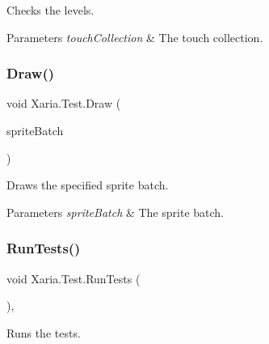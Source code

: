 Checks the levels. 


\begin{DoxyParams}{Parameters}
{\em touch\+Collection} & The touch collection.\\
\hline
\end{DoxyParams}
\mbox{\label{classXaria_1_1Test_a0c23a1aea214e972d3f48f2542343036}} 
\subsubsection{\texorpdfstring{Draw()}{Draw()}}
{\footnotesize\ttfamily void Xaria.\+Test.\+Draw (\begin{DoxyParamCaption}\item[{ref Sprite\+Batch}]{sprite\+Batch }\end{DoxyParamCaption})\hspace{0.3cm}{\ttfamily [inline]}}



Draws the specified sprite batch. 


\begin{DoxyParams}{Parameters}
{\em sprite\+Batch} & The sprite batch.\\
\hline
\end{DoxyParams}
\mbox{\label{classXaria_1_1Test_ad254f5685477c88d63b0a0ebd0ae81de}} 
\subsubsection{\texorpdfstring{Run\+Tests()}{RunTests()}}
{\footnotesize\ttfamily void Xaria.\+Test.\+Run\+Tests (\begin{DoxyParamCaption}{ }\end{DoxyParamCaption})\hspace{0.3cm}{\ttfamily [inline]}, {\ttfamily [private]}}



Runs the tests. 

\mbox{\label{classXaria_1_1Test_a9eff33d099d4327f6215d8ff34adbdb8}} 
